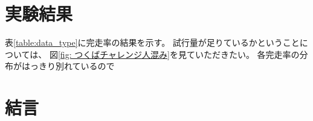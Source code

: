 \documentclass{jarticle}
\begin{document}
\section{実験結果}%

表\ref{table:data_type}に完走率の結果を示す。
試行量が足りているかということについては、
図\ref{fig: つくばチャレンジ人混み}を見ていただきたい。
各完走率の分布がはっきり別れているので



\section{結言}%


\footnotesize
\begin{thebibliography}{99}




\end{thebibliography}

\normalsize
\end{document}

